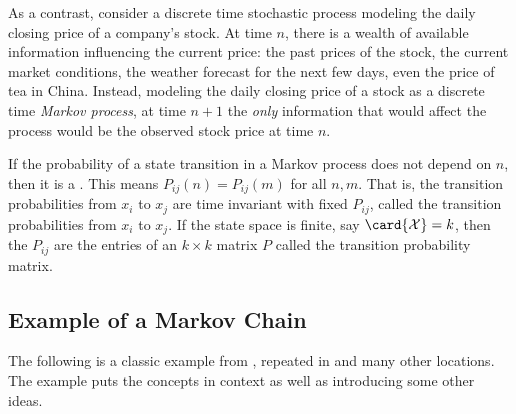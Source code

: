 \documentclass[12pt]{article}
\begin{document}
\begin{example}
  As a contrast, consider a discrete time stochastic process
  modeling the daily closing price of a
company's stock.  At time \( n \), there is a wealth of available
information influencing the current price:  the past prices of the stock, the current market
conditions, the weather forecast for the next few days, even the price
of tea in China. Instead, modeling the daily closing price of a stock as
a discrete time \emph{Markov process}, at time \( n + 1 \) the \emph{only}
information that would affect the process would be the observed stock
price at time \( n \).
\end{example}

\begin{definition}
    If the probability of a state transition in a Markov process does
    not depend on \( n \), then it is a .%
    This means \( P_{ij}(n)=P_{ij}(m) \) for all \( n,m \). That is, the
    transition probabilities from \( x_i \) to \( x_j \) are time
    invariant with fixed \( P_{ij} \), called the transition
    probabilities from \( x_i \) to \( x_j \).  If the state space is
    finite, say \( \card{\mathcal{X}} = k \), then the \( P_{ij} \) are
    the entries of an \( k \times k \) matrix \( P \) called the
    transition probability matrix.
\end{definition}

\subsection*{Example of a Markov Chain}

The following is a classic example from
\cite{kemeny74}, repeated in
\cite{grinstead97} and many other locations.  The example puts the
concepts in context as well as introducing some other ideas.
\end{document}
